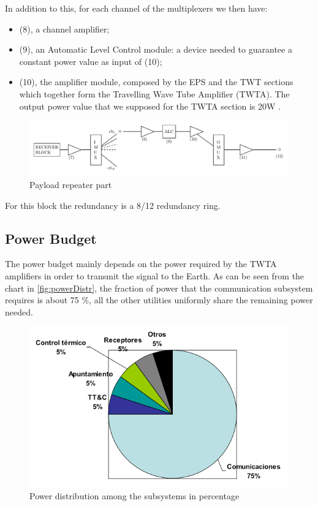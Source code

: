 \documentclass[11pt,a4paper,titlepage]{article}
\begin{document}
In addition to this, for each channel of the multiplexers we then have:
			\begin{itemize}
			\item (8), a channel amplifier;
			\item (9), an Automatic Level Control module: a device needed to guarantee a constant power value as input of 					(10);
			\item (10), the amplifier module, composed by the EPS and the TWT sections which together form the Travelling Wave Tube Amplifier (TWTA). The output power value that we supposed for the TWTA section is 20W \cite{Maral2017}.
			\end{itemize}
			\begin{figure}[h]
				\centering
				\includegraphics[width = \textwidth]{payload_repeater.pdf}
				\caption{Payload repeater part}
				\label{fig:repeater}
			\end{figure}
For this block the redundancy is a 8/12 redundancy ring.

	\subsection{Power Budget}
	The power budget mainly depends on the power required by the TWTA amplifiers in order to transmit the signal to the Earth. As can be seen from the chart in \autoref{fig:powerDistr}, the fraction of power that the communication subsystem requires is about 75 \%, all the other utilities uniformly share the remaining power needed.
	\begin{figure}[h]
		\centering
		\includegraphics[width = .7\textwidth]{powerDistr.png}
		\caption{Power distribution among the subsystems in percentage}
		\label{fig:powerDistr}
	\end{figure}
\end{document}
